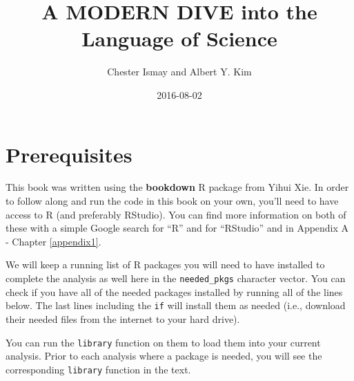 \documentclass[]{tufte-book}
\title{A MODERN DIVE into the Language of Science}
\author{Chester Ismay and Albert Y. Kim}
\date{2016-08-02}
\newenvironment{Shaded}{\begin{snugshade}}{\end{snugshade}}
\newcommand{\KeywordTok}[1]{\textcolor[rgb]{0.13,0.29,0.53}{\textbf{{#1}}}}
\newcommand{\DataTypeTok}[1]{\textcolor[rgb]{0.13,0.29,0.53}{{#1}}}
\newcommand{\StringTok}[1]{\textcolor[rgb]{0.31,0.60,0.02}{{#1}}}
\newcommand{\CommentTok}[1]{\textcolor[rgb]{0.56,0.35,0.01}{\textit{{#1}}}}
\newcommand{\NormalTok}[1]{{#1}}
\begin{document}
\maketitle



{
\setcounter{tocdepth}{1}
\tableofcontents
}

\chapter{Prerequisites}\label{prereqs}

This book was written using the \textbf{bookdown} R package from Yihui
Xie. In order to follow along and run the code in this book on your own,
you'll need to have access to R (and preferably RStudio). You can find
more information on both of these with a simple Google search for ``R''
and for ``RStudio'' and in Appendix A - Chapter \ref{appendix1}.

We will keep a running list of R packages you will need to have
installed to complete the analysis as well here in the
\texttt{needed\_pkgs} character vector. You can check if you have all of
the needed packages installed by running all of the lines below. The
last lines including the \texttt{if} will install them as needed (i.e.,
download their needed files from the internet to your hard drive).

You can run the \texttt{library} function on them to load them into your
current analysis. Prior to each analysis where a package is needed, you
will see the corresponding \texttt{library} function in the text.

\begin{Shaded}
\end{Shaded}
\end{document}
